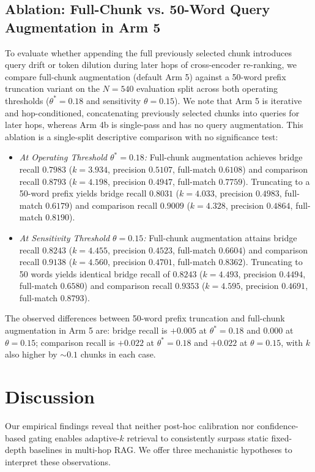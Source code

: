 \documentclass[conference]{IEEEtran}
\begin{document}
\subsection{Ablation: Full-Chunk vs. 50-Word Query Augmentation in Arm 5}
\label{sec:results-ablation}
To evaluate whether appending the full previously selected chunk introduces query drift or token dilution during later hops of cross-encoder re-ranking, we compare full-chunk augmentation (default Arm 5) against a 50-word prefix truncation variant on the $N=540$ evaluation split across both operating thresholds ($\theta^*=0.18$ and sensitivity $\theta=0.15$). We note that Arm 5 is iterative and hop-conditioned, concatenating previously selected chunks into queries for later hops, whereas Arm 4b is single-pass and has no query augmentation. This ablation is a single-split descriptive comparison with no significance test:
\begin{itemize}
    \item \textit{At Operating Threshold $\theta^*=0.18$:} Full-chunk augmentation achieves bridge recall $0.7983$ ($k=3.934$, precision $0.5107$, full-match $0.6108$) and comparison recall $0.8793$ ($k=4.198$, precision $0.4947$, full-match $0.7759$). Truncating to a 50-word prefix yields bridge recall $0.8031$ ($k=4.033$, precision $0.4983$, full-match $0.6179$) and comparison recall $0.9009$ ($k=4.328$, precision $0.4864$, full-match $0.8190$).
    \item \textit{At Sensitivity Threshold $\theta=0.15$:} Full-chunk augmentation attains bridge recall $0.8243$ ($k=4.455$, precision $0.4523$, full-match $0.6604$) and comparison recall $0.9138$ ($k=4.560$, precision $0.4701$, full-match $0.8362$). Truncating to 50 words yields identical bridge recall of $0.8243$ ($k=4.493$, precision $0.4494$, full-match $0.6580$) and comparison recall $0.9353$ ($k=4.595$, precision $0.4691$, full-match $0.8793$).
\end{itemize}
The observed differences between 50-word prefix truncation and full-chunk augmentation in Arm 5 are: bridge recall is $+0.005$ at $\theta^*=0.18$ and $0.000$ at $\theta=0.15$; comparison recall is $+0.022$ at $\theta^*=0.18$ and $+0.022$ at $\theta=0.15$, with $k$ also higher by $\sim 0.1$ chunks in each case.

\enlargethispage{4\baselineskip}
\section{Discussion}
\label{sec:discussion}
Our empirical findings reveal that neither post-hoc calibration nor confidence-based gating enables adaptive-$k$ retrieval to consistently surpass static fixed-depth baselines in multi-hop RAG. We offer three mechanistic hypotheses to interpret these observations.
\end{document}
